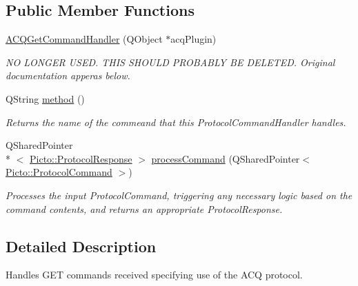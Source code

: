 \subsection*{Public Member Functions}
\begin{DoxyCompactItemize}
\item 
\hyperlink{struct_a_c_q_get_command_handler_a927fb1059ecae1eb1e7d40506caf280e}{A\-C\-Q\-Get\-Command\-Handler} (Q\-Object $\ast$acq\-Plugin)
\begin{DoxyCompactList}\small\item\em N\-O L\-O\-N\-G\-E\-R U\-S\-E\-D. T\-H\-I\-S S\-H\-O\-U\-L\-D P\-R\-O\-B\-A\-B\-L\-Y B\-E D\-E\-L\-E\-T\-E\-D. Original documentation apperas below. \end{DoxyCompactList}\item 
\hypertarget{struct_a_c_q_get_command_handler_acf1c72e3da29b51efe472a70e084d256}{Q\-String \hyperlink{struct_a_c_q_get_command_handler_acf1c72e3da29b51efe472a70e084d256}{method} ()}\label{struct_a_c_q_get_command_handler_acf1c72e3da29b51efe472a70e084d256}

\begin{DoxyCompactList}\small\item\em Returns the name of the commeand that this Protocol\-Command\-Handler handles. \end{DoxyCompactList}\item 
\hypertarget{struct_a_c_q_get_command_handler_aad2afc7875c2444098c5ac7787904cb7}{Q\-Shared\-Pointer\\*
$<$ \hyperlink{struct_picto_1_1_protocol_response}{Picto\-::\-Protocol\-Response} $>$ \hyperlink{struct_a_c_q_get_command_handler_aad2afc7875c2444098c5ac7787904cb7}{process\-Command} (Q\-Shared\-Pointer$<$ \hyperlink{struct_picto_1_1_protocol_command}{Picto\-::\-Protocol\-Command} $>$)}\label{struct_a_c_q_get_command_handler_aad2afc7875c2444098c5ac7787904cb7}

\begin{DoxyCompactList}\small\item\em Processes the input Protocol\-Command, triggering any necessary logic based on the command contents, and returns an appropriate Protocol\-Response. \end{DoxyCompactList}\end{DoxyCompactItemize}


\subsection{Detailed Description}
Handles G\-E\-T commands received specifying use of the A\-C\-Q protocol. 

